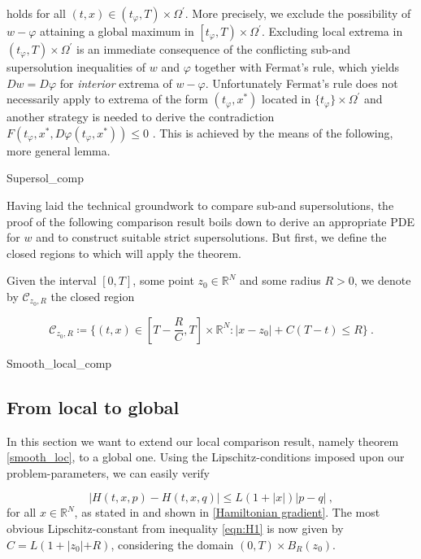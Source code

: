 		holds for all $ (t, x) \in \left( t_{\varphi}, T \right) \times\Omega^{\prime} $. More precisely, we exclude the possibility of $ w -\varphi $ attaining a global maximum in $ \left[ t_{\varphi}, T \right) \times \Omega^{\prime} $. Excluding local extrema in ${ \left( t_{\varphi}, T \right) \times \Omega^{\prime} }$ is an immediate consequence of the conflicting sub-and supersolution inequalities of $ w $ and $ \varphi $ together with Fermat's rule, which yields $ Dw = D\varphi $ for \emph{interior} extrema of $ w - \varphi $. Unfortunately Fermat's rule does not necessarily apply to extrema of the form $ (t_{\varphi}, x^{*}) $ located in $ \{t_{\varphi} \}\times \Omega^{\prime}  $ and another strategy is needed to derive the contradiction $ F(t_{\varphi}, x^{*}, D\varphi(t_\varphi, x^{*})) \leq 0 $ . This is achieved by the means of the following, more general lemma.
		
		{Supersol_comp}
	
		Having laid the technical groundwork to compare sub-and supersolutions, the proof of the following comparison result boils down to derive an appropriate PDE for $ w $ and to construct suitable strict supersolutions. But first, we define the closed regions to which will apply the theorem.
		
		\begin{definition}
			\label{regions}
			Given the interval $ \left[0, T\right] $, some point $ z_0 \in \mathbb{R}^N $ and some radius $ R > 0 $, we denote by $ \mathcal{C}_{z_0, R} $ the closed region
			
			\begin{equation*}
			\mathcal{C}_{z_0, R} \coloneqq \Bigg\{ (t, x) \in \left[ T - \frac{R}{C}, T \right] \times \mathbb{R}^N: \lvert x - z_0 \rvert + C(T-t) \leq R \Bigg\} \ .
			\end{equation*}
		\end{definition}
		
		{Smooth_local_comp}
	
	\subsection{From local to global}
		In this section we want to extend our local comparison result, namely theorem \ref{smooth_loc}, to a global one. Using the Lipschitz-conditions imposed upon our problem-parameters, we can easily verify
		
		\begin{equation}
			\label{varying_Lipschitz}
			\lvert H(t, x, p) - H(t, x, q) \rvert \leq L \left(1 + \lvert x \rvert \right) \lvert p - q \rvert \ ,
		\end{equation}
		for all $ x \in \mathbb{R}^{N} $, as stated in \cite[p.~167]{zhou} and shown in \ref{Hamiltonian gradient}. The most obvious Lipschitz-constant from inequality \eqref{eqn:H1} is now given by $ C = L (1 + \lvert z_0 \lvert + R) $, considering the domain $ \left(0, T \right) \times B_R(z_0) $.
		
